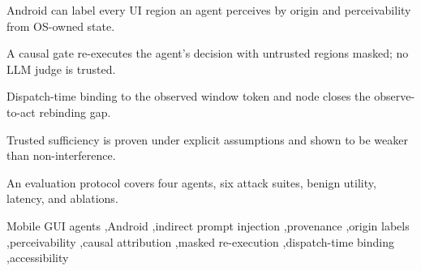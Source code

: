 \begin{highlights}
\item Android can label every UI region an agent perceives by origin and perceivability from OS-owned state.
\item A causal gate re-executes the agent's decision with untrusted regions masked; no LLM judge is trusted.
\item Dispatch-time binding to the observed window token and node closes the observe-to-act rebinding gap.
\item Trusted sufficiency is proven under explicit assumptions and shown to be weaker than non-interference.
\item An evaluation protocol covers four agents, six attack suites, benign utility, latency, and ablations.
\end{highlights}

\begin{keyword}
Mobile GUI agents \sep Android \sep indirect prompt injection \sep provenance \sep origin labels \sep perceivability \sep causal attribution \sep masked re-execution \sep dispatch-time binding \sep accessibility
\end{keyword}
